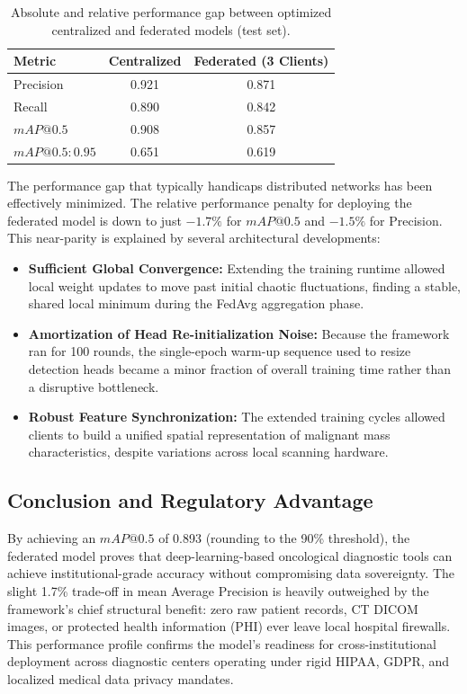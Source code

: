 \begin{table}[htbp]
	\centering
	\caption{Absolute and relative performance gap between optimized centralized and federated models (test set).}
	\label{tab:performance_gap}
	\begin{tabular}{lcc}
		\toprule
		\textbf{Metric} & \textbf{Centralized} & \textbf{Federated (3 Clients)}\\
		\midrule
		Precision       & 0.921 & 0.871 \\
		Recall          & 0.890 & 0.842\\
		$mAP@0.5$       & 0.908 & 0.857\\
		$mAP@0.5:0.95$  & 0.651 & 0.619\\
		\bottomrule
	\end{tabular}
\end{table}

The performance gap that typically handicaps distributed networks has been effectively minimized. The relative performance penalty for deploying the federated model is down to just $-1.7\%$ for $mAP@0.5$ and $-1.5\%$ for Precision. This near-parity is explained by several architectural developments:

\begin{itemize}
	\item \textbf{Sufficient Global Convergence:} Extending the training runtime allowed local weight updates to move past initial chaotic fluctuations, finding a stable, shared local minimum during the FedAvg aggregation phase.
	\item \textbf{Amortization of Head Re-initialization Noise:} Because the framework ran for 100 rounds, the single-epoch warm-up sequence used to resize detection heads became a minor fraction of overall training time rather than a disruptive bottleneck.
	\item \textbf{Robust Feature Synchronization:} The extended training cycles allowed clients to build a unified spatial representation of malignant mass characteristics, despite variations across local scanning hardware.
\end{itemize}

\subsection{Conclusion and Regulatory Advantage}
By achieving an $mAP@0.5$ of 0.893 (rounding to the 90\% threshold), the federated model proves that deep-learning-based oncological diagnostic tools can achieve institutional-grade accuracy without compromising data sovereignty. The slight 1.7\% trade-off in mean Average Precision is heavily outweighed by the framework's chief structural benefit: zero raw patient records, CT DICOM images, or protected health information (PHI) ever leave local hospital firewalls. This performance profile confirms the model's readiness for cross-institutional deployment across diagnostic centers operating under rigid HIPAA, GDPR, and localized medical data privacy mandates.
